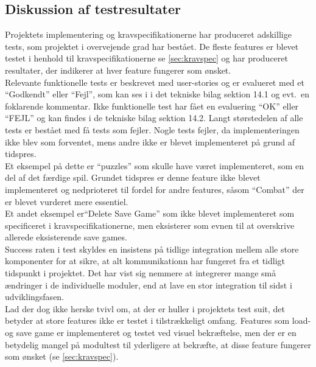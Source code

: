 \subsection{Diskussion af testresultater}
Projektets implementering og kravspecifikationerne har produceret adskillige tests, som 
projektet i overvejende grad har bestået. De fleste features er blevet
testet i henhold til kravspecifikationerne se \autoref{sec:kravspec} og har produceret 
resultater, der indikerer at hver feature fungerer som ønsket. \\

\noindent Relevante funktionelle tests er beskrevet med user-stories og er evalueret med et ``Godkendt''
eller ``Fejl'', som kan ses i i det tekniske bilag sektion 14.1 og evt.\ en foklarende kommentar. 
Ikke funktionelle 
test har fået en evaluering ``OK'' eller ``FEJL'' og kan findes i de tekniske bilag sektion 14.2.
Langt størstedelen af alle tests er bestået med få tests som fejler. 
Nogle tests fejler, da implementeringen ikke blev som forventet, mens andre ikke er blevet 
implementeret på grund af tidspres. \\

\noindent Et eksempel på dette er ``puzzles'' som skulle have været implementeret, som en del af det færdige spil.
Grundet tidspres er denne feature ikke blevet implementeret og
nedprioteret til fordel for andre features, såsom ``Combat'' der er blevet vurderet mere essentiel.\\

\noindent Et andet eksempel er``Delete Save Game'' som ikke blevet implementeret som specificeret i kravspecifikationerne, men
eksisterer som evnen til at overskrive allerede eksisterende save games.\\
Success raten i test skyldes en insistens på tidlige integration mellem alle store komponenter for at sikre, at 
alt kommunikationn har fungeret fra et tidligt 
tidspunkt i projektet. Det har vist sig nemmere at integrerer mange små ændringer i de individuelle moduler, end at lave en stor integration til sidst i udviklingsfasen.\\

\noindent Lad der dog ikke herske tvivl om, at der er huller i projektets test suit, det
betyder at store features ikke er testet i tilstrækkeligt omfang. Features som load- og save game er implementeret og testet ved visuel bekræftelse, men der er en betydelig mangel på modultest til yderligere at bekræfte, at disse feature fungerer som ønsket (se \autoref{sec:kravspec}). \\

